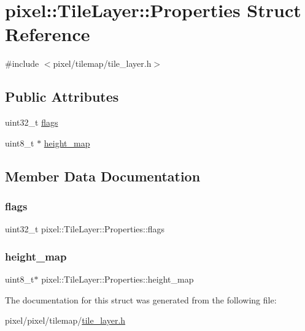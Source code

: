 \hypertarget{structpixel_1_1_tile_layer_1_1_properties}{}\section{pixel\+:\+:Tile\+Layer\+:\+:Properties Struct Reference}
\label{structpixel_1_1_tile_layer_1_1_properties}


{\ttfamily \#include $<$pixel/tilemap/tile\+\_\+layer.\+h$>$}

\subsection*{Public Attributes}
\begin{DoxyCompactItemize}
\item 
uint32\+\_\+t \hyperlink{structpixel_1_1_tile_layer_1_1_properties_a67fcb4eb4b6b041324a08ec2aa8ef3f7}{flags}
\item 
uint8\+\_\+t $\ast$ \hyperlink{structpixel_1_1_tile_layer_1_1_properties_a9bad1a071416a7eacb80b7079f3c889b}{height\+\_\+map}
\end{DoxyCompactItemize}


\subsection{Member Data Documentation}
\mbox{\label{structpixel_1_1_tile_layer_1_1_properties_a67fcb4eb4b6b041324a08ec2aa8ef3f7}} 
\subsubsection{\texorpdfstring{flags}{flags}}
{\footnotesize\ttfamily uint32\+\_\+t pixel\+::\+Tile\+Layer\+::\+Properties\+::flags}

\mbox{\label{structpixel_1_1_tile_layer_1_1_properties_a9bad1a071416a7eacb80b7079f3c889b}} 
\subsubsection{\texorpdfstring{height\+\_\+map}{height\_map}}
{\footnotesize\ttfamily uint8\+\_\+t$\ast$ pixel\+::\+Tile\+Layer\+::\+Properties\+::height\+\_\+map}



The documentation for this struct was generated from the following file\+:\begin{DoxyCompactItemize}
\item 
pixel/pixel/tilemap/\hyperlink{tile__layer_8h}{tile\+\_\+layer.\+h}\end{DoxyCompactItemize}
